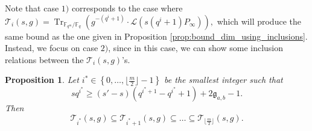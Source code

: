 \documentclass[a4paper]{amsart}
\newtheorem{proposition}[thm]{Proposition}
\theoremstyle{definition}
\theoremstyle{remark}
\newcommand{\calL}{\mathcal{L}}
\newcommand{\calT}{\mathcal{T}}
\newcommand{\fq}{\mathbb{F}_{q}}
\newcommand{\Tr}[1]{\operatorname{Tr}_{\mathbb{F}_{q^m}/\fq}\left(#1\right)}
\newcommand{\set}[1]{\left\{#1\right\}}
\begin{document}
Note that case $\textit{1)}$ corresponds to the case where $\calT_i(s,g) = \Tr{g^{-(q^i+1)}\cdot \calL(s(q^i+1)P_\infty)}, $ which will produce the same bound as the one given in Proposition \ref{prop:bound_dim_using_inclusions}.
Instead, we focus on case $\textit{2)}$, since in this case, we can show some inclusion relations between the $\calT_i(s,g)$'s.


\begin{proposition} \label{prop:inclusion_T_i's} Let $i^* \in \set{0,\dots,\lfloor\frac{m}{2}\rfloor-1}$ be the smallest integer such that 
\begin{equation} \label{eq:cond_s_s'_i_star}
sq^{i^*} \geq (s'-s)(q^{i^*+1}-q^{i^{*}}+1)+2\mathfrak{g}_{a,b}-1.
\end{equation} 
Then
$$\calT_{i^*}(s,g) \subseteq \calT_{i^*+1}(s,g) \subseteq \dots \subseteq \calT_{\lfloor \frac{m}{2}\rfloor}(s,g).$$
\end{proposition}
\end{document}
